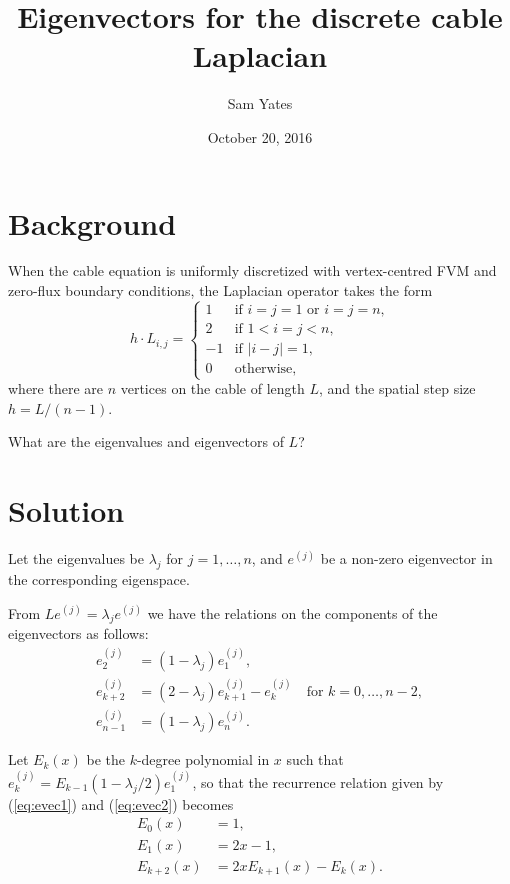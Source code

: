 \documentclass[parskip=half]{scrartcl}
\title{Eigenvectors for the discrete cable Laplacian}
\author{Sam Yates}
\date{October 20, 2016}
\begin{document}
\maketitle

\section{Background}

When the cable equation is uniformly discretized with vertex-centred FVM and
zero-flux boundary conditions, the Laplacian operator takes the form
\[
    h\cdot L_{i, j} =
    \begin{cases}
	1 & \text{if $i=j=1$ or $i=j=n$,}\\
	2 & \text{if $1<i=j<n$,}\\
	-1 & \text{if $|i-j|=1$,}\\
	0 & \text{otherwise,}
    \end{cases}
\]
where there are $n$ vertices on the cable of length $L$, and the spatial
step size $h=L/(n-1)$.

What are the eigenvalues and eigenvectors of $L$?

\section{Solution}

Let the eigenvalues be $\lambda_j$ for $j=1,\dots,n$, and $e^{(j)}$
be a non-zero eigenvector in the corresponding eigenspace.

From $L e^{(j)}=\lambda_j e^{(j)}$ we have the relations on the components
of the eigenvectors as follows:
\begin{align}
    \label{eq:evec1}
    e^{(j)}_2 &= (1-\lambda_j) e^{(j)}_1,\\
    \label{eq:evec2}
    e^{(j)}_{k+2} &= (2-\lambda_j) e^{(j)}_{k+1} - e^{(j)}_k \quad\text{for $k=0,\dots,n-2$},\\
    \label{eq:evec3}
    e^{(j)}_{n-1} &= (1-\lambda_j) e^{(j)}_n.
\end{align}

Let $E_k(x)$ be the $k$-degree polynomial in $x$ such that
$e^{(j)}_k = E_{k-1}(1-\lambda_j/2) e^{(j)}_1$, so that the recurrence relation given by
(\ref{eq:evec1}) and (\ref{eq:evec2}) becomes
\begin{align}
    E_0(x) &= 1,\\
    E_1(x) &= 2x-1,\\
    \label{eq:erec}
    E_{k+2}(x) &= 2x E_{k+1}(x) - E_k(x).
\end{align}
\end{document}
